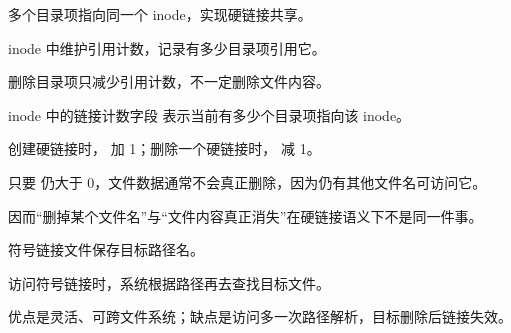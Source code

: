 \begin{points}
  \item 多个目录项指向同一个 inode，实现硬链接共享。
  \item inode 中维护引用计数，记录有多少目录项引用它。
  \item 删除目录项只减少引用计数，不一定删除文件内容。
\end{points}


\begin{points}
  \item inode 中的链接计数字段  表示当前有多少个目录项指向该 inode。
  \item 创建硬链接时， 加 1；删除一个硬链接时， 减 1。
  \item 只要  仍大于 0，文件数据通常不会真正删除，因为仍有其他文件名可访问它。
  \item 因而“删掉某个文件名”与“文件内容真正消失”在硬链接语义下不是同一件事。
\end{points}


\begin{points}
  \item 符号链接文件保存目标路径名。
  \item 访问符号链接时，系统根据路径再去查找目标文件。
  \item 优点是灵活、可跨文件系统；缺点是访问多一次路径解析，目标删除后链接失效。
\end{points}
